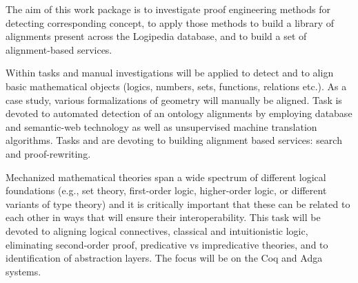 \begin{workpackage}[id=alignment,type=RTD,wphases=1-48,
  short={Proof engineering},%
  title={Proof engineering},
  lead=Lee,
  LeeRM=12,  %
  StrRM=18,  %
  BelRM=18,  %
  ImtRM=6,  %
  InnRM=6,  %
  SacRM=6,  %
  FauRM=11, %
  BolRM=13, %
  InrRM=6   %
  ]

  \begin{wpobjectives}
    The aim of this work package is to investigate proof engineering
    methods for detecting corresponding concept, to apply those methods
    to build a library of alignments present across the Logipedia
    database, and to build a set of alignment-based services.
  \end{wpobjectives}

  \begin{wpdescription}
    Within tasks  and
     manual investigations will be
    applied to detect and to align basic mathematical objects (logics,
    numbers, sets, functions, relations etc.). As a case study,
    various formalizations of geometry will manually be aligned. Task
     is devoted to automated detection of
    an ontology alignments by employing database and semantic-web
    technology as well as unsupervised machine translation algorithms.
    Tasks  and 
    are devoting to building alignment based services: search and
    proof-rewriting.
  \end{wpdescription}

\begin{tasklist}
  \begin{task}[id=alignlogic,title=Logical foundations,shorttitle=Logical foundations,lead=Lee,LeeRM=12,wphases=6-24!.67]
    Mechanized mathematical theories span a wide spectrum of different
    logical foundations (e.g., set theory, first-order logic,
    higher-order logic, or different variants of type theory) and it
    is critically important that these can be related to each other in
    ways that will ensure their interoperability. This task will be
    devoted to aligning logical connectives, classical and
    intuitionistic logic, eliminating second-order proof, predicative
    vs impredicative theories, and to identification of abstraction
    layers. The focus will be on the Coq and Adga systems.
  \end{task}
  

\end{tasklist}
\end{workpackage}
